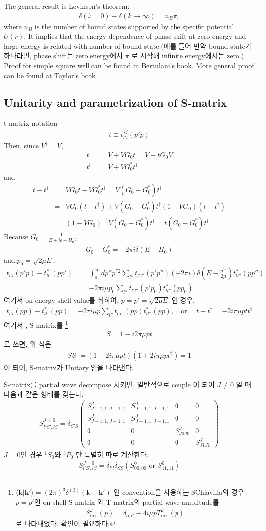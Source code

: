 \documentclass[10pt]{book}
\def\bm{\boldsymbol}
\newcommand{\bea}{\begin{eqnarray}}
\newcommand{\eea}{\end{eqnarray}}
\newcommand{\no}{\nonumber \\}
\def\vk{{\bm k}}
\def\la{\langle}
\def\ra{\rangle}
\begin{document}
The general result is Levinson's theorem:
\bea 
\delta(k=0)-\delta(k\to\infty)=n_B\pi, 
\eea 
where $n_B$ is the number of bound states supported by the specific potential $U(r)$. 
It implies that the energy dependence of phase shift at zero energy and large energy
is related with number of bound state.(예를 들어 만약 bound state가 하나라면, phase shift는 
zero energy에서 $\pi$ 로 시작해 infinite energy에서는 zero.)
Proof for simple square well can be found in Bertulani's book. 
More general proof can be found at Taylor's book 


\subsection{Unitarity and parametrization of S-matrix }
t-matrix notation
\bea
t\equiv t^{sj}_{l'l}(p'p)
\eea
Then, since $V^\dagger=V$,
\bea
t&=&V+VG_0t=V+tG_0 V\no 
t^\dagger&=&V+VG_0^* t^\dagger
\eea
and
\bea
t-t^\dagger&=&VG_0t-VG_0^* t^\dagger=V(G_0-G_0^*)t^\dagger\no
                 &=&VG_0(t-t^\dagger)+V(G_0-G_0^*)t^\dagger(1-VG_0)(t-t^\dagger)\no
                 & =&(1-VG_0)^{-1}V(G_0-G_0^*)t^\dagger
                   =t(G_0-G_0^*)t^\dagger
\eea
Because $G_0=\frac{1}{E+i\epsilon-H_0}$,
\bea
G_0-G_0^*=-2\pi i\delta(E-H_0)
\eea
and,$p_0=\sqrt{2\mu E}$,
\bea
t_{l'l}(p'p)-t^*_{ll'}(pp')
&=&\int_0^\infty dp'' p^{''2}\sum_{l''}t_{l'l''}(p'p'')(-2\pi i)\delta(E-\frac{p^{''2}}{2\mu})
     t^*_{ll''}(pp'')\no
&=&-2\pi i \mu p_0\sum_{l''}t_{l'l''}(p' p_0)t^*_{ll''}(p p_0)
\eea
여기서 on-energy shell value를 취하여, $p=p'=\sqrt{2\mu E}$ 인 경우,
\bea
t_{l'l}(pp)-t^*_{ll'}(pp)=-2\pi i \mu p\sum_{l''}t_{l' l''}(pp)t^*_{l l''}(pp),\quad
\mbox{or }\quad t-t^\dagger=-2i\pi \mu p t t^\dagger
\eea
여기서 , S-matrix를 \footnote{
$\la \vk|\vk'\ra=(2\pi)^3\delta^{(3)}(\vk-\vk')$
인 convention을 사용하는 SChiavilla의 경우 $p=p'$인 
on-shell S-matrix 와 T-matrix의 
partial wave amplitude를
\bea
S^J_{\alpha\alpha'}(p)=\delta_{\alpha\alpha'}-4i \mu p T^J_{\alpha\alpha'}(p)
\eea
로 나타내었다. 확인이 필요하다.
}
\bea
S=1-i2\pi \mu p t
\eea
로 쓰면, 위 식은 
\bea
S S^\dagger=(1-2i\pi \mu p t)(1+2i\pi \mu p t^\dagger)=1
\eea
이 되어, S-matrix가 Unitary 임을 나타낸다. 

S-matrix를 partial wave decompose 시키면,
일반적으로 couple 이 되어 $J\neq 0$ 일 때 다음과 같은 형태를 갖는다.
\bea
S^{J\neq 0}_{l' S', l S}=\delta_{S'S}\left(
\begin{array}{cccc}
 S^{J}_{J-1,1,J-1,1} & S^J_{J-1,1, J+1,1} & 0 & 0 \\
 S^{J}_{J+1,1,J-1,1} & S^J_{J+1,1, J+1,1} & 0 & 0 \\
0 & 0 & S^J_{J 0 J0} & 0\\
0 & 0 & 0 & S^J_{J1 J1}
\end{array}
\right)
\eea
$J=0$인 경우 $^1S_0$와 $^3P_0$ 만 특별히 따로 계산한다.
\bea
S^{J=0}_{l'S',lS}=\delta_{l'l}\delta_{SS} (S^0_{00,00}\mbox{ or } S^0_{11,11})                   
\eea
\end{document}
